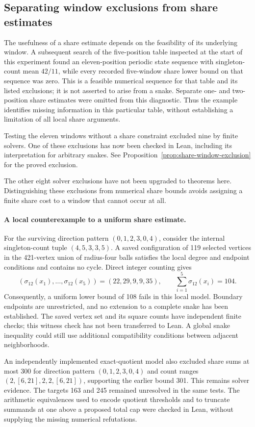 \documentclass[11pt,a4paper]{article}
\theoremstyle{definition}
\theoremstyle{remark}
\begin{document}
\subsection{Separating window exclusions from share estimates}
The usefulness of a share estimate depends on the feasibility of its underlying window. A subsequent search of the five-position table inspected at the start of this experiment found an eleven-position periodic state sequence with singleton-count mean $42/11$, while every recorded five-window share lower bound on that sequence was zero. This is a feasible numerical sequence for that table and its listed exclusions; it is not asserted to arise from a snake. Separate one- and two-position share estimates were omitted from this diagnostic. Thus the example identifies missing information in this particular table, without establishing a limitation of all local share arguments.

Testing the eleven windows without a share constraint excluded nine by finite solvers. One of these exclusions has now been checked in Lean, including its interpretation for arbitrary snakes.
See Proposition~\ref{prop:share-window-exclusion} for the proved exclusion.


The other eight solver exclusions have not been upgraded to theorems here. Distinguishing these exclusions from numerical share bounds avoids assigning a finite share cost to a window that cannot occur at all.

\paragraph{A local counterexample to a uniform share estimate.}
For the surviving direction pattern $(0,1,2,3,0,4)$, consider the internal singleton-count tuple $(4,5,3,3,5)$. A saved configuration of 119 selected vertices in the 421-vertex union of radius-four balls satisfies the local degree and endpoint conditions and contains no cycle. Direct integer counting gives
\[
(\sigma_{12}(x_1),\ldots,\sigma_{12}(x_5))=(22,29,9,9,35),
\qquad \sum_{i=1}^{5}\sigma_{12}(x_i)=104.
\]
Consequently, a uniform lower bound of 108 fails in this local model. Boundary endpoints are unrestricted, and no extension to a complete snake has been established. The saved vertex set and its square counts have independent finite checks; this witness check has not been transferred to Lean. A global snake inequality could still use additional compatibility conditions between adjacent neighborhoods.

An independently implemented exact-quotient model also excluded share sums at most 300 for direction pattern $(0,1,2,3,0,4)$ and count ranges $(2,[6,21],2,2,[6,21])$, supporting the earlier bound 301. This remains solver evidence. The targets 163 and 245 remained unresolved in the same tests. The arithmetic equivalences used to encode quotient thresholds and to truncate summands at one above a proposed total cap were checked in Lean, without supplying the missing numerical refutations.
\end{document}
